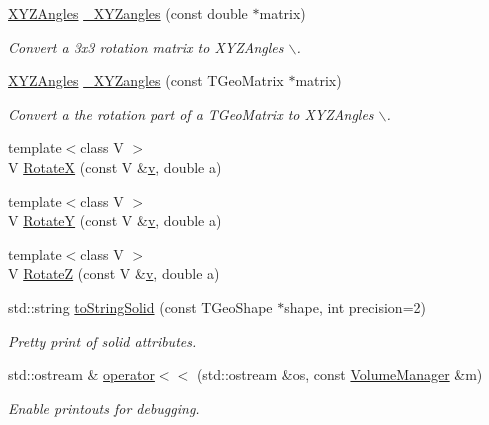 \begin{DoxyCompactItemize}
\hyperlink{namespace_d_d4hep_1_1_geometry_ab195c63789d4928d291d3b5522151aaa}{XYZAngles} \hyperlink{group___d_d4_h_e_p___g_e_o_m_e_t_r_y_ga446608ca1668ae2b3ad24c3ea5b2bc1e}{\_\-XYZangles} (const double $\ast$matrix)
\begin{DoxyCompactList}\small\item\em Convert a 3x3 rotation matrix to XYZAngles $\backslash$. \item\end{DoxyCompactList}\item 
\hyperlink{namespace_d_d4hep_1_1_geometry_ab195c63789d4928d291d3b5522151aaa}{XYZAngles} \hyperlink{group___d_d4_h_e_p___g_e_o_m_e_t_r_y_gaf4d63a5a06b85c2a65143cc5f15a81fe}{\_\-XYZangles} (const TGeoMatrix $\ast$matrix)
\begin{DoxyCompactList}\small\item\em Convert a the rotation part of a TGeoMatrix to XYZAngles $\backslash$. \item\end{DoxyCompactList}\item 
{\footnotesize template$<$class V $>$ }\\V \hyperlink{namespace_d_d4hep_1_1_geometry_ab9a1ffea2a77a54efcc6568d626f81de}{RotateX} (const V \&\hyperlink{_multi_view_8cpp_a8320ee13ac034dbf6d624fe8953dd337}{v}, double a)
\item 
{\footnotesize template$<$class V $>$ }\\V \hyperlink{namespace_d_d4hep_1_1_geometry_a675b466e6e9a3c67f53dd7d23f5540ab}{RotateY} (const V \&\hyperlink{_multi_view_8cpp_a8320ee13ac034dbf6d624fe8953dd337}{v}, double a)
\item 
{\footnotesize template$<$class V $>$ }\\V \hyperlink{namespace_d_d4hep_1_1_geometry_a4d413c51d1ece05ff9e6fc14246b8d95}{RotateZ} (const V \&\hyperlink{_multi_view_8cpp_a8320ee13ac034dbf6d624fe8953dd337}{v}, double a)
\item 
std::string \hyperlink{namespace_d_d4hep_1_1_geometry_abd683b63937908cc4e95e3db3d4879a0}{toStringSolid} (const TGeoShape $\ast$shape, int precision=2)
\begin{DoxyCompactList}\small\item\em Pretty print of solid attributes. \item\end{DoxyCompactList}\item 
std::ostream \& \hyperlink{namespace_d_d4hep_1_1_geometry_a3e162786678e79867327c71e9699ac71}{operator$<$$<$} (std::ostream \&os, const \hyperlink{class_d_d4hep_1_1_geometry_1_1_volume_manager}{VolumeManager} \&m)
\begin{DoxyCompactList}\small\item\em Enable printouts for debugging. \item\end{DoxyCompactList}\end{DoxyCompactItemize}



